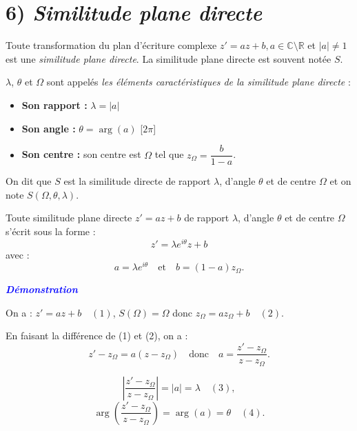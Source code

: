 \documentclass{article}
\begin{document}
\section*{6) \textit{Similitude plane directe}}

Toute transformation du plan d’écriture complexe \( z' = a z + b,  a \in \mathbb{C} \setminus \mathbb{R} \) et \( |a| \neq 1 \) est une \textit{similitude plane directe}. La similitude plane directe est souvent notée \( S \).

\( \lambda \), \( \theta \) et \( \Omega \) sont appelés \textit{les éléments caractéristiques de la similitude plane directe} :

\begin{itemize}
    \item \textbf{Son rapport :} \( \lambda = |a| \)
    \item \textbf{Son angle :} \( \theta = \arg(a) \) [\(2\pi\)]
    \item \textbf{Son centre :} son centre est \( \Omega \) tel que \( z_{\Omega} = \dfrac{b}{1 - a} \).
\end{itemize}

On dit que \( S \) est la similitude directe de rapport \( \lambda \), d’angle \( \theta \) et de centre \( \Omega \) et on note \(S(\Omega,\theta,\lambda) \).

\vspace{0.3cm}

Toute similitude plane directe \( z' = a z + b \) de rapport \( \lambda \), d’angle \( \theta \) et de centre \( \Omega \) s'écrit sous la forme :
\[
z' = \lambda e^{i\theta} z + b
\]
avec :
\[
a = \lambda e^{i\theta} \quad \text{et} \quad b = (1 - a) z_{\Omega}.
\]

\textbf{\textcolor{blue}{\textit{Démonstration}}}

\vspace{0.3cm}

On a : \( z' = a z + b \quad (1) \), \quad \( S(\Omega) = \Omega \) \quad donc \( z_{\Omega} = a z_{\Omega} + b \quad (2) \).

\vspace{0.3cm}

En faisant la différence de (1) et (2), on a : 
\[
z' - z_{\Omega} = a( z - z_{\Omega}) \quad \text{donc} \quad a = \frac{z' - z_{\Omega}}{z - z_{\Omega}}.
\]

\[
\left| \frac{z' - z_{\Omega}}{z - z_{\Omega}} \right| = |a| = \lambda \quad (3),
\]
\[
\arg \left( \frac{z' - z_{\Omega}}{z - z_{\Omega}} \right) = \arg(a) = \theta \quad (4).
\]
\end{document}
